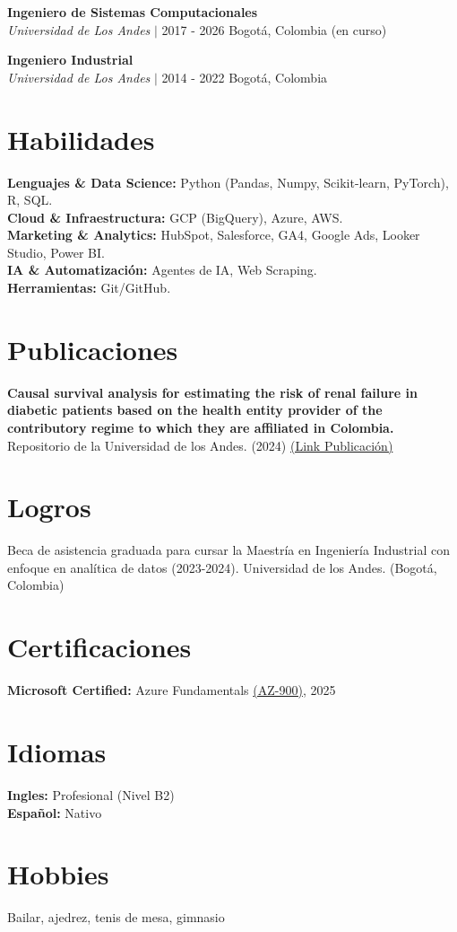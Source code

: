 \documentclass[9pt, letterpaper]{extarticle}
\begin{document}
        \vspace{10pt}

        \textbf{Ingeniero de Sistemas Computacionales} \\
        \textit{Universidad de Los Andes} $\vert$ 2017 - 2026 Bogotá, Colombia (en curso)

        \vspace{10pt}

        \textbf{Ingeniero Industrial} \\
        \textit{Universidad de Los Andes} $\vert$ 2014 - 2022 Bogotá, Colombia

    \section*{Habilidades}
        \textbf{Lenguajes \& Data Science:} Python (Pandas, Numpy, Scikit-learn, PyTorch), R, SQL. \\
        \textbf{Cloud \& Infraestructura:} GCP (BigQuery), Azure, AWS. \\
        \textbf{Marketing \& Analytics:} HubSpot, Salesforce, GA4, Google Ads, Looker Studio, Power BI. \\
        \textbf{IA \& Automatización:} Agentes de IA, Web Scraping. \\
        \textbf{Herramientas:} Git/GitHub. 
        
    \section*{Publicaciones}
        \textbf{Causal survival analysis for estimating the risk of renal failure in diabetic patients based on the health entity provider of the contributory regime to which they are affiliated in Colombia.} \\
        Repositorio de la Universidad de los Andes. (2024) \href{https://hdl.handle.net/1992/75234}{(Link Publicación)}
        
    \section*{Logros}
        Beca de asistencia graduada para cursar la Maestría en Ingeniería Industrial con enfoque en analítica de datos (2023-2024). Universidad de los Andes. (Bogotá, Colombia)

    \section*{Certificaciones}
        \textbf{Microsoft Certified:} Azure Fundamentals \href{https://learn.microsoft.com/es-es/users/jhonvega-6603/credentials/7704dbc5a72d05f?ref=https%3A%2F%2Fwww.google.com%2F}{(AZ-900)}, 2025

    \section*{Idiomas}
        \textbf{Ingles:} Profesional (Nivel B2) \\
        \textbf{Español:} Nativo

    \section*{Hobbies}
        Bailar, ajedrez, tenis de mesa, gimnasio
\end{document}
